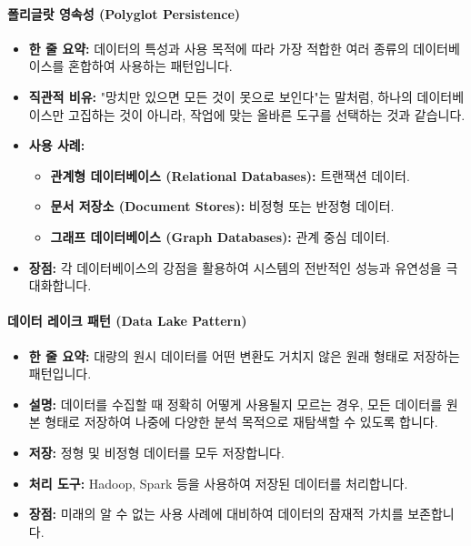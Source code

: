 \documentclass[11pt,a4paper]{article}
\theoremstyle{definition}
\begin{document}
\paragraph{폴리글랏 영속성 (Polyglot Persistence)}
\begin{itemize}
    \item \textbf{한 줄 요약:} 데이터의 특성과 사용 목적에 따라 가장 적합한 여러 종류의 데이터베이스를 혼합하여 사용하는 패턴입니다.
    \item \textbf{직관적 비유:} "망치만 있으면 모든 것이 못으로 보인다"는 말처럼, 하나의 데이터베이스만 고집하는 것이 아니라, 작업에 맞는 올바른 도구를 선택하는 것과 같습니다.
    \item \textbf{사용 사례:}
    \begin{itemize}
        \item \textbf{관계형 데이터베이스 (Relational Databases):} 트랜잭션 데이터.
        \item \textbf{문서 저장소 (Document Stores):} 비정형 또는 반정형 데이터.
        \item \textbf{그래프 데이터베이스 (Graph Databases):} 관계 중심 데이터.
    \end{itemize}
    \item \textbf{장점:} 각 데이터베이스의 강점을 활용하여 시스템의 전반적인 성능과 유연성을 극대화합니다.
\end{itemize}

\paragraph{데이터 레이크 패턴 (Data Lake Pattern)}
\begin{itemize}
    \item \textbf{한 줄 요약:} 대량의 원시 데이터를 어떤 변환도 거치지 않은 원래 형태로 저장하는 패턴입니다.
    \item \textbf{설명:} 데이터를 수집할 때 정확히 어떻게 사용될지 모르는 경우, 모든 데이터를 원본 형태로 저장하여 나중에 다양한 분석 목적으로 재탐색할 수 있도록 합니다.
    \item \textbf{저장:} 정형 및 비정형 데이터를 모두 저장합니다.
    \item \textbf{처리 도구:} Hadoop, Spark 등을 사용하여 저장된 데이터를 처리합니다.
    \item \textbf{장점:} 미래의 알 수 없는 사용 사례에 대비하여 데이터의 잠재적 가치를 보존합니다.
\end{itemize}
\end{document}
